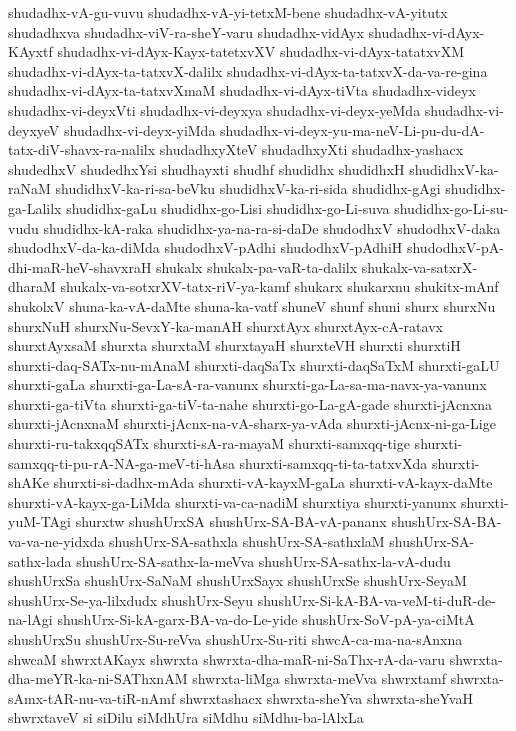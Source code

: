 {shudadhx-vA-gu-vuvu
shudadhx-vA-yi-tetxM-bene
shudadhx-vA-yitutx
shudadhxva
shudadhx-viV-ra-sheY-varu
shudadhx-vidAyx
shudadhx-vi-dAyx-KAyxtf
shudadhx-vi-dAyx-Kayx-tatetxvXV
shudadhx-vi-dAyx-tatatxvXM
shudadhx-vi-dAyx-ta-tatxvX-dalilx
shudadhx-vi-dAyx-ta-tatxvX-da-va-re-gina
shudadhx-vi-dAyx-ta-tatxvXmaM
shudadhx-vi-dAyx-tiVta
shudadhx-videyx
shudadhx-vi-deyxVti
shudadhx-vi-deyxya
shudadhx-vi-deyx-yeMda
shudadhx-vi-deyxyeV
shudadhx-vi-deyx-yiMda
shudadhx-vi-deyx-yu-ma-neV-Li-pu-du-dA-tatx-diV-shavx-ra-nalilx
shudadhxyXteV
shudadhxyXti
shudadhx-yashacx
shudedhxV
shudedhxYsi
shudhayxti
shudhf
shudidhx
shudidhxH
shudidhxV-ka-raNaM
shudidhxV-ka-ri-sa-beVku
shudidhxV-ka-ri-sida
shudidhx-gAgi
shudidhx-ga-Lalilx
shudidhx-gaLu
shudidhx-go-Lisi
shudidhx-go-Li-suva
shudidhx-go-Li-su-vudu
shudidhx-kA-raka
shudidhx-ya-na-ra-si-daDe
shudodhxV
shudodhxV-daka
shudodhxV-da-ka-diMda
shudodhxV-pAdhi
shudodhxV-pAdhiH
shudodhxV-pA-dhi-maR-heV-shavxraH
shukalx
shukalx-pa-vaR-ta-dalilx
shukalx-va-satxrX-dharaM
shukalx-va-sotxrXV-tatx-riV-ya-kamf
shukarx
shukarxnu
shukitx-mAnf
shukolxV
shuna-ka-vA-daMte
shuna-ka-vatf
shuneV
shunf
shuni
shurx
shurxNu
shurxNuH
shurxNu-SevxY-ka-manAH
shurxtAyx
shurxtAyx-cA-ratavx
shurxtAyxsaM
shurxta
shurxtaM
shurxtayaH
shurxteVH
shurxti
shurxtiH
shurxti-daq-SATx-nu-mAnaM
shurxti-daqSaTx
shurxti-daqSaTxM
shurxti-gaLU
shurxti-gaLa
shurxti-ga-La-sA-ra-vanunx
shurxti-ga-La-sa-ma-navx-ya-vanunx
shurxti-ga-tiVta
shurxti-ga-tiV-ta-nahe
shurxti-go-La-gA-gade
shurxti-jAcnxna
shurxti-jAcnxnaM
shurxti-jAcnx-na-vA-sharx-ya-vAda
shurxti-jAcnx-ni-ga-Lige
shurxti-ru-takxqqSATx
shurxti-sA-ra-mayaM
shurxti-samxqq-tige
shurxti-samxqq-ti-pu-rA-NA-ga-meV-ti-hAsa
shurxti-samxqq-ti-ta-tatxvXda
shurxti-shAKe
shurxti-si-dadhx-mAda
shurxti-vA-kayxM-gaLa
shurxti-vA-kayx-daMte
shurxti-vA-kayx-ga-LiMda
shurxti-va-ca-nadiM
shurxtiya
shurxti-yanunx
shurxti-yuM-TAgi
shurxtw
shushUrxSA
shushUrx-SA-BA-vA-pananx
shushUrx-SA-BA-va-va-ne-yidxda
shushUrx-SA-sathxla
shushUrx-SA-sathxlaM
shushUrx-SA-sathx-lada
shushUrx-SA-sathx-la-meVva
shushUrx-SA-sathx-la-vA-dudu
shushUrxSa
shushUrx-SaNaM
shushUrxSayx
shushUrxSe
shushUrx-SeyaM
shushUrx-Se-ya-lilxdudx
shushUrx-Seyu
shushUrx-Si-kA-BA-va-veM-ti-duR-de-na-lAgi
shushUrx-Si-kA-garx-BA-va-do-Le-yide
shushUrx-SoV-pA-ya-ciMtA
shushUrxSu
shushUrx-Su-reVva
shushUrx-Su-riti
shwcA-ca-ma-na-sAnxna
shwcaM
shwrxtAKayx
shwrxta
shwrxta-dha-maR-ni-SaThx-rA-da-varu
shwrxta-dha-meYR-ka-ni-SAThxnAM
shwrxta-liMga
shwrxta-meVva
shwrxtamf
shwrxta-sAmx-tAR-nu-va-tiR-nAmf
shwrxtashacx
shwrxta-sheYva
shwrxta-sheYvaH
shwrxtaveV
si
siDilu
siMdhUra
siMdhu
siMdhu-ba-lAlxLa
}
